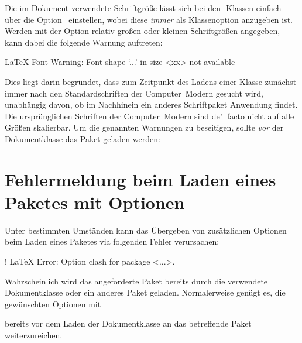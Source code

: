 %
Die im Dokument verwendete Schriftgröße lässt sich bei den \KOMAScript-Klassen 
einfach über die Option~ einstellen, wobei diese \emph{immer} 
als Klassenoption anzugeben ist. Werden mit der Option relativ großen oder 
kleinen Schriftgrößen angegeben, kann dabei die folgende Warnung auftreten:
%
\begin{quoting}[rightmargin=0pt]
\begin{Code}[escapechar=§]
LaTeX Font Warning: Font shape `...' in size <xx> not available
\end{Code}
\end{quoting}
%
Dies liegt darin begründet, dass zum Zeitpunkt des Ladens einer Klasse zunächst 
immer nach den Standardschriften der Computer~Modern gesucht wird, unabhängig 
davon, ob im Nachhinein ein anderes Schriftpaket Anwendung findet. Die 
ursprünglichen Schriften der Computer~Modern sind de"~facto nicht auf alle 
Größen skalierbar. Um die genannten Warnungen zu beseitigen, sollte \emph{vor} 
der Dokumentklasse das Paket  geladen werden:
%
\begin{quoting}[rightmargin=0pt]
\end{quoting}



\section{%
  Fehlermeldung beim Laden eines Paketes mit Optionen%
}

%
Unter bestimmten Umständen kann das Übergeben von zusätzlichen Optionen beim 
Laden eines Paketes via 
folgenden Fehler verursachen:
%
\begin{quoting}
\begin{Code}[escapechar=§]
! LaTeX Error: Option clash for package <...>.
\end{Code}
\end{quoting}
%
Wahrscheinlich wird das angeforderte Paket bereits durch die verwendete 
Dokumentklasse oder ein anderes Paket geladen. Normalerweise genügt es, die 
gewünschten Optionen mit
\begin{quoting}
\newline%
%
\end{quoting}
bereits vor dem Laden der Dokumentklasse an das betreffende Paket 
weiterzureichen.




